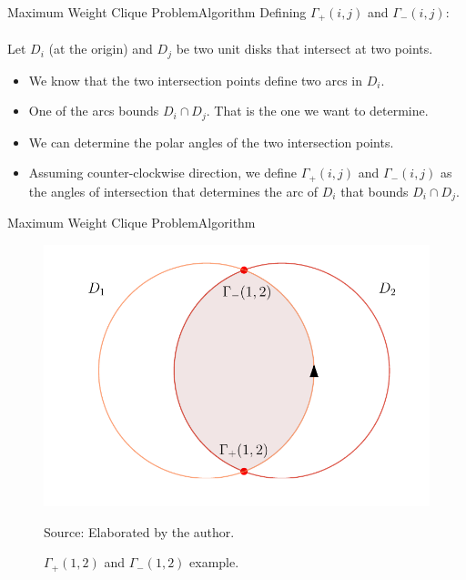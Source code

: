 \documentclass{beamer}
\newcommand{\source}[1]{\caption*{Source: {#1}} }
\begin{document}
\begin{frame}{Maximum Weight Clique Problem}{Algorithm}
	Defining $\Gamma_+(i,j)$ and $\Gamma_-(i,j)$:\\~\\

	Let $D_i$ (at the origin) and $D_j$ be two unit disks that intersect at two points.
	
	\begin{itemize}
		\item We know that the two intersection points define two arcs in $D_i$.
		\item One of the arcs bounds $D_i\cap D_j$. That is the one we want to determine.
		
		\item We can determine the polar angles of the two intersection points.
		\item Assuming counter-clockwise direction, we define $\Gamma_+(i,j)$ and $\Gamma_-(i,j)$ as the angles of intersection that determines the arc of $D_i$ that bounds $D_i \cap D_j$.
	\end{itemize}
\end{frame}

\begin{frame}{Maximum Weight Clique Problem}{Algorithm}

\begin{figure}
	\caption{$\Gamma_+(1,2)$ and $\Gamma_-(1,2)$ example.}
	\includegraphics[scale=0.65]{figures/gammas.pdf}
		\source{Elaborated by the author.}
\end{figure}
\end{frame}
\end{document}
